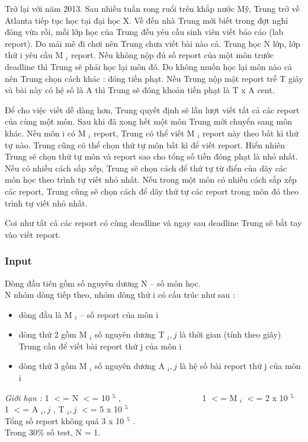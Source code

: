 

Trở lại với năm 2013. Sau nhiều tuần rong ruổi trên khắp nước Mỹ, Trung trở về Atlanta tiếp tục học tại đại học X. Về đến nhà Trung mới biết trong đợt nghỉ đông vừa rồi, mỗi lớp học của Trung đều yêu cầu sinh viên viết báo cáo (lab report). Do mải mê đi chơi nên Trung chưa viết bài nào cả. Trung học N lớp, lớp thứ i yêu cầu M $_ i $ report. Nếu không nộp đủ số report của một môn trước deadline thì Trung sẽ phải học lại môn đó. Do không muốn học lại môn nào cả nên Trung chọn cách khác : đóng tiền phạt. Nếu Trung nộp một report trễ T giây và bài này có hệ số là A thì Trung sẽ đóng khoản tiền phạt là T x A cent.

Để cho việc viết dễ dàng hơn, Trung quyết định sẽ lần lượt viết tất cả các report của cùng một môn. Sau khi đã xong hết một môn Trung mới chuyển sang môn khác. Nếu môn i có M $_ i $ report, Trung có thể viết M $_ i $ report này theo bất kì thứ tự nào. Trung cũng có thể chọn thứ tự môn bất kì để viết report. Hiển nhiên Trung sẽ chọn thứ tự môn và report sao cho tổng số tiền đóng phạt là nhỏ nhất. Nếu có nhiều cách sắp xếp, Trung sẽ chọn cách để thứ tự từ điển của dãy các môn học theo trình tự viết nhỏ nhất. Nếu trong một môn có nhiều cách sắp xếp các report, Trung cũng sẽ chọn cách để dãy thứ tự các report trong môn đó theo trình tự viết nhỏ nhất.

Coi như tất cả các report có cùng deadline và ngay sau deadline Trung sẽ bắt tay vào viết report.

\subsubsection{Input}

Dòng đầu tiên gồm số nguyên dương N – số môn học.
\\N nhóm dòng tiếp theo, nhóm dòng thứ i có cấu trúc như sau :
\begin{itemize}
	\item dòng đầu là M $_ i $ – số report của môn i
	\item dòng thứ 2 gồm M $_ i $ số nguyên dương T $_ i,j $ là thời gian (tính theo giây) Trung cần để viết bài report thứ j của môn i
	\item dòng thứ 3 gồm M $_ i $ số nguyên dương A $_ i,j $ là hệ số bài report thứ j của môn i
\end{itemize}

\emph{Giới hạn : } 1 $<$= N $<$= 10 $^ 5 $ ,                    1 $<$= M $_ i $ $<$= 2 x 10 $^ 5 $
\\1 $<$= A $_ i,j $ , T $_ i,j $ $<$= 5 x 10 $^ 5 $
\\Tổng số report không quá 3 x 10 $^ 5 $ .
\\Trong 30\% số test, N = 1.

